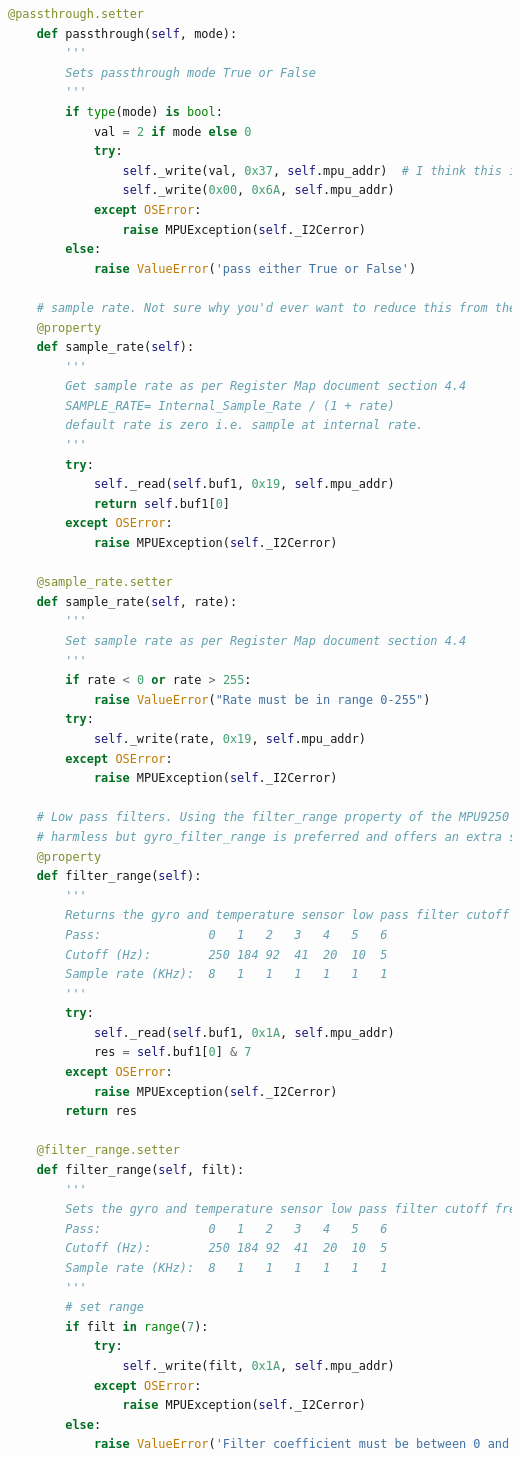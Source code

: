\documentclass[conference]{IEEEtran}
\begin{document}
\begin{lstlisting}[language=Python, caption=IMU Code, label=imu_code]
    @passthrough.setter
    def passthrough(self, mode):
        '''
        Sets passthrough mode True or False
        '''
        if type(mode) is bool:
            val = 2 if mode else 0
            try:
                self._write(val, 0x37, self.mpu_addr)  # I think this is right.
                self._write(0x00, 0x6A, self.mpu_addr)
            except OSError:
                raise MPUException(self._I2Cerror)
        else:
            raise ValueError('pass either True or False')

    # sample rate. Not sure why you'd ever want to reduce this from the default.
    @property
    def sample_rate(self):
        '''
        Get sample rate as per Register Map document section 4.4
        SAMPLE_RATE= Internal_Sample_Rate / (1 + rate)
        default rate is zero i.e. sample at internal rate.
        '''
        try:
            self._read(self.buf1, 0x19, self.mpu_addr)
            return self.buf1[0]
        except OSError:
            raise MPUException(self._I2Cerror)

    @sample_rate.setter
    def sample_rate(self, rate):
        '''
        Set sample rate as per Register Map document section 4.4
        '''
        if rate < 0 or rate > 255:
            raise ValueError("Rate must be in range 0-255")
        try:
            self._write(rate, 0x19, self.mpu_addr)
        except OSError:
            raise MPUException(self._I2Cerror)

    # Low pass filters. Using the filter_range property of the MPU9250 is
    # harmless but gyro_filter_range is preferred and offers an extra setting.
    @property
    def filter_range(self):
        '''
        Returns the gyro and temperature sensor low pass filter cutoff frequency
        Pass:               0   1   2   3   4   5   6
        Cutoff (Hz):        250 184 92  41  20  10  5
        Sample rate (KHz):  8   1   1   1   1   1   1
        '''
        try:
            self._read(self.buf1, 0x1A, self.mpu_addr)
            res = self.buf1[0] & 7
        except OSError:
            raise MPUException(self._I2Cerror)
        return res

    @filter_range.setter
    def filter_range(self, filt):
        '''
        Sets the gyro and temperature sensor low pass filter cutoff frequency
        Pass:               0   1   2   3   4   5   6
        Cutoff (Hz):        250 184 92  41  20  10  5
        Sample rate (KHz):  8   1   1   1   1   1   1
        '''
        # set range
        if filt in range(7):
            try:
                self._write(filt, 0x1A, self.mpu_addr)
            except OSError:
                raise MPUException(self._I2Cerror)
        else:
            raise ValueError('Filter coefficient must be between 0 and 6')


\end{lstlisting}
\end{document}
